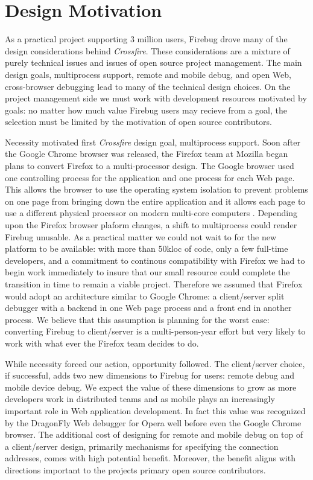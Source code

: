 \section{Design Motivation}
As a practical project supporting 3 million users,  Firebug drove many of the design considerations behind \textit{Crossfire}. These considerations are a mixture of purely technical issues and issues of open source project management. The main design goals, multiprocess support, remote and mobile debug, and open Web, cross-browser debugging lead to many of the technical design choices. On the project management side we must work with development resources motivated by goals: no matter how much value Firebug users may recieve from a goal, the selection must be limited by the motivation of open source contributors.

Necessity motivated first \textit{Crossfire} design goal, multiprocess support. Soon after the Google Chrome browser was released, the Firefox team at Mozilla began plans to convert Firefox to a multi-processor design.  The Google browser used one controlling process for the application and one process for each Web page.  This allows the browser to use the operating system isolation to prevent problems on one page from bringing down the entire application and it allows each page to use a different physical processor on modern multi-core computers \cite{GoogleChrome}.  Depending upon the Firefox browser plaform changes, a shift to multiprocess could render Firebug unusable. As a practical matter we could not wait to for the new platform to be available: with more than 50kloc of code, only a few full-time developers, and a commitment to continous compatibility with Firefox we had to begin work immediately to insure that our small resource could complete the transition in time to remain a viable project. Therefore we assumed that Firefox would adopt an architecture similar to Google Chrome: a client/server split debugger with a backend in one Web page process and a front end in another process.  We believe that this assumption is planning for the worst case: converting Firebug to client/server is a multi-person-year effort but very likely to work with what ever the Firefox team decides to do.

While necessity forced our action, opportunity followed. The client/server choice, if successful, adds two new dimensions to Firebug for users: remote debug and mobile device debug. We expect the value of these dimensions to grow as more developers work in distributed teams and as mobile plays an increasingly important role in Web application development.  In fact this value was recognized by the DragonFly Web debugger for Opera well before even the Google Chrome browser.   The additional cost of designing for remote and mobile debug on top of a client/server design, primarily mechanisms for specifying the connection addresses, comes with high potential benefit.  Moreover, the benefit aligns with directions important to the projects primary open source contributors.

